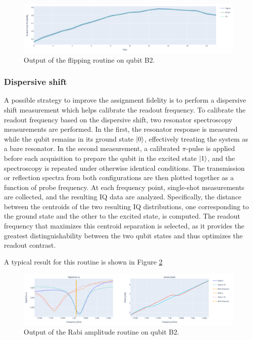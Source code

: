\begin{figure}[h!]
    \centering
    \includegraphics[width=\textwidth]{figures/png/flipping.png}
    \caption{Output of the flipping routine on qubit B2.}
    \label{fig:flipping}
\end{figure}

\subsubsection{Dispersive shift}
A possible strategy to improve the assignment fidelity is to perform a dispersive shift measurement which helps calibrate the readout frequency.
To calibrate the readout frequency based on the dispersive shift, two resonator spectroscopy measurements are performed. 
In the first, the resonator response is measured while the qubit remains in its ground state $\ket{0}$, effectively treating the system as a bare resonator. 
In the second measurement, a calibrated $\pi$-pulse is applied before each acquisition to prepare the qubit in the excited state $\ket{1}$, and the spectroscopy is repeated under otherwise identical conditions. 
The transmission or reflection spectra from both configurations are then plotted together as a function of probe frequency. 
At each frequency point, single-shot measurements are collected, and the resulting IQ data are analyzed. 
Specifically, the distance between the centroids of the two resulting IQ distributions, one corresponding to the ground state and the other to the excited state, is computed. 
The readout frequency that maximizes this centroid separation is selected, as it provides the greatest distinguishability between the two qubit states and thus optimizes the readout contrast.

A typical result for this routine is shown in Figure \ref{fig:dispersive_shift}

\begin{figure}[h!]
    \centering
    \includegraphics[width=\textwidth]{figures/png/dispersive_shift.png}
    \caption{Output of the Rabi amplitude routine on qubit B2.}
    \label{fig:dispersive_shift}
\end{figure}

